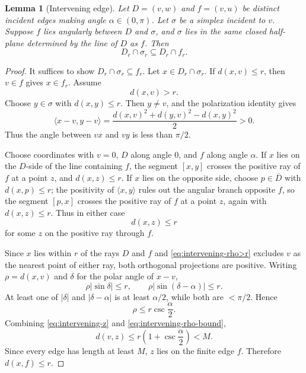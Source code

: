 \documentclass[11pt]{article}
\newtheorem{lemma}[theorem]{Lemma}
\numberwithin{equation}{section}
\begin{document}
\begin{lemma}[Intervening edge]\label{lem:intervening-edge}
Let $D=(v,w)$ and $f=(v,u)$ be distinct incident edges making angle $\alpha\in(0,\pi)$. Let $\sigma$ be a simplex incident to $v$. Suppose $f$ lies angularly between $D$ and $\sigma$, and $\sigma$ lies in the same closed half-plane determined by the line of $D$ as $f$. Then
\[
\boxed{D_r\cap\sigma_r\subseteq D_r\cap f_r.}
\]
\end{lemma}

\begin{proof}
It suffices to show $D_r\cap\sigma_r\subseteq f_r$. Let $x\in D_r\cap\sigma_r$. If $d(x,v)\le r$, then $v\in f$ gives $x\in f_r$. Assume
\begin{equation}\label{eq:intervening-rho>r}
d(x,v)>r.
\end{equation}
Choose $y\in\sigma$ with $d(x,y)\le r$. Then $y\ne v$, and the polarization identity gives
\[
\langle x-v,y-v\rangle
=
\frac{d(x,v)^2+d(y,v)^2-d(x,y)^2}{2}>0.
\]
Thus the angle between $vx$ and $vy$ is less than $\pi/2$.

Choose coordinates with $v=0$, $D$ along angle $0$, and $f$ along angle $\alpha$. If $x$ lies on the $D$-side of the line containing $f$, the segment $[x,y]$ crosses the positive ray of $f$ at a point $z$, and $d(x,z)\le r$. If $x$ lies on the opposite side, choose $p\in\overline D$ with $d(x,p)\le r$; the positivity of $\langle x,y\rangle$ rules out the angular branch opposite $f$, so the segment $[p,x]$ crosses the positive ray of $f$ at a point $z$, again with $d(x,z)\le r$. Thus in either case
\begin{equation}\label{eq:intervening-z}
d(x,z)\le r
\end{equation}
for some $z$ on the positive ray through $f$.

Since $x$ lies within $r$ of the rays $D$ and $f$ and \eqref{eq:intervening-rho>r} excludes $v$ as the nearest point of either ray, both orthogonal projections are positive. Writing $\rho=d(x,v)$ and $\delta$ for the polar angle of $x-v$,
\[
\rho|\sin\delta|\le r,
\qquad
\rho|\sin(\delta-\alpha)|\le r.
\]
At least one of $|\delta|$ and $|\delta-\alpha|$ is at least $\alpha/2$, while both are $<\pi/2$. Hence
\begin{equation}\label{eq:intervening-rho-bound}
\rho\le r\csc\frac\alpha2.
\end{equation}
Combining \eqref{eq:intervening-z} and \eqref{eq:intervening-rho-bound},
\[
d(v,z)\le r\left(1+\csc\frac\alpha2\right)<M.
\]
Since every edge has length at least $M$, $z$ lies on the finite edge $f$. Therefore $d(x,f)\le r$.
\end{proof}
\end{document}
